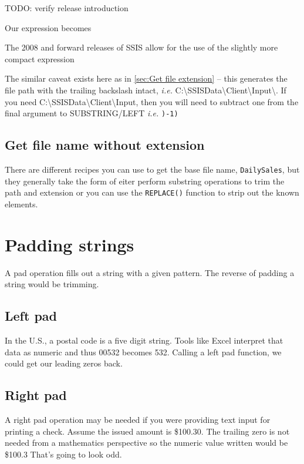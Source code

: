 TODO: verify release introduction

Our expression becomes




The 2008 and forward releases of SSIS allow for the use of the slightly more compact expression



The similar caveat exists here as in \ref{sec:Get file extension} -- this generates the file path with the trailing backslash intact, {\em i.e.} C:\textbackslash SSISData\textbackslash Client\textbackslash Input\textbackslash . If you need C:\textbackslash SSISData\textbackslash Client\textbackslash Input, then you will need to subtract one from the final argument to SUBSTRING/LEFT {\em i.e.} \verb|)-1)|


\section{Get file name without extension}
\label{sec:Get file name without extension}
There are different recipes you can use to get the base file name, \verb|DailySales|, but they generally take the form of eiter perform substring operations to trim the path and extension or you can use the \verb|REPLACE()| function to strip out the known elements.

\chapter{Padding strings}
\label{chap:Padding strings}
A pad operation fills out a string with a given pattern. The reverse of padding a string would be trimming.

\section{Left pad}
\label{sec:Left pad}
In the U.S., a postal code is a five digit string. Tools like Excel interpret that data as numeric and thus 00532 becomes 532. Calling a left pad function, we could get our leading zeros back. 

\section{Right pad}
\label{sec:Right pad}
A right pad operation may be needed if you were providing text input for printing a check. Assume the issued amount is \$100.30. The trailing zero is not needed from a mathematics perspective so the numeric value written would be \$100.3 That's going to look odd.

